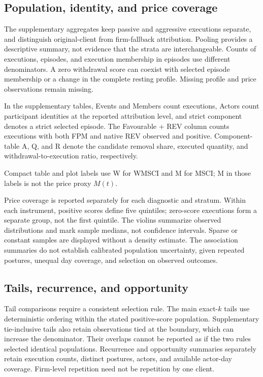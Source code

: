 \documentclass[11pt]{article}
\begin{document}
\subsection{Population, identity, and price coverage}
The supplementary aggregates keep passive and aggressive executions separate, and distinguish original-client from firm-fallback attribution. Pooling provides a descriptive summary, not evidence that the strata are interchangeable. Counts of executions, episodes, and execution membership in episodes use different denominators. A zero withdrawal score can coexist with selected episode membership or a change in the complete resting profile. Missing profile and price observations remain missing.

In the supplementary tables, Events and Members count executions, Actors count participant identities at the reported attribution level, and strict component denotes a strict selected episode. The Favourable + REV column counts executions with both FPM and native REV observed and positive. Component-table A, Q, and R denote the candidate removal share, executed quantity, and withdrawal-to-execution ratio, respectively.

Compact table and plot labels use W for WMSCI and M for MSCI; M in those labels is not the price proxy $M(t)$.

Price coverage is reported separately for each diagnostic and stratum. Within each instrument, positive scores define five quintiles; zero-score executions form a separate group, not the first quintile. The violins summarize observed distributions and mark sample medians, not confidence intervals. Sparse or constant samples are displayed without a density estimate. The association summaries do not establish calibrated population uncertainty, given repeated postures, unequal day coverage, and selection on observed outcomes.

\subsection{Tails, recurrence, and opportunity}
Tail comparisons require a consistent selection rule. The main exact-$k$ tails use deterministic ordering within the stated positive-score population. Supplementary tie-inclusive tails also retain observations tied at the boundary, which can increase the denominator. Their overlaps cannot be reported as if the two rules selected identical populations. Recurrence and opportunity summaries separately retain execution counts, distinct postures, actors, and available actor-day coverage. Firm-level repetition need not be repetition by one client.
\end{document}
